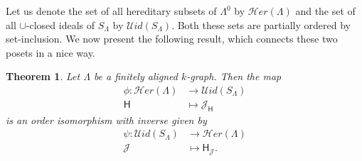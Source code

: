 \documentclass[a4paper,reqno,11pt]{amsart}
\numberwithin{equation}{section}
\newtheorem{thm}{Theorem}[section]
\theoremstyle{definition}
\theoremstyle{remark}
\begin{document}
Let us denote the set of all hereditary subsets of $\Lambda^0$ by $\mathscr{H}er(\Lambda)$ and the set of all $\cup$-closed ideals of $S_\Lambda$ by $\mathscr{U}id(S_\Lambda)$. Both these sets are partially ordered by set-inclusion. We now present the following result, which connects these two posets in a nice way.

\begin{thm}\label{th structure thm for U-closed ideals}
Let $\Lambda$ be a finitely aligned $k$-graph. Then the map 
\begin{align*}
\phi: \mathscr{H}er(\Lambda)&\longrightarrow \mathscr{U}id(S_\Lambda)\\
\mathsf{H} &\longmapsto \mathcal{J}_\mathsf{H}
\end{align*} 
is an order isomorphism with inverse given by
\begin{align*}
\psi: \mathscr{U}id(S_\Lambda) &\longrightarrow \mathscr{H}er(\Lambda)\\
\mathcal{J} &\longmapsto \mathsf{H}_\mathcal{J}.
\end{align*}
\end{thm}
\end{document}
